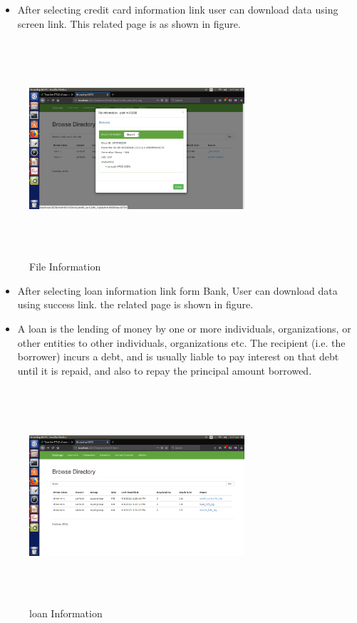 \begin{itemize}
    \item After selecting credit card information link user can download data using screen link. This related page is as shown in figure.
\end{itemize}
\begin{figure}[htb]
\centering
\includegraphics[width=8cm,height=8cm]{5p.png}
    \caption{File Information}
\end{figure} \newpage
\begin{itemize}
    \item After selecting loan information link form Bank, User can download data using success link. the related page is shown in figure.
    \item A loan is the lending of money by one or more individuals, organizations, or other entities to other individuals, organizations etc. The recipient (i.e. the borrower) incurs a debt, and is usually liable to pay interest on that debt until it is repaid, and also to repay the principal amount borrowed. 
\end{itemize}
\begin{figure}[htb]
\centering
\includegraphics[width=8cm,height=8cm]{6p.png}
    \caption{loan Information}
\end{figure} \newpage

